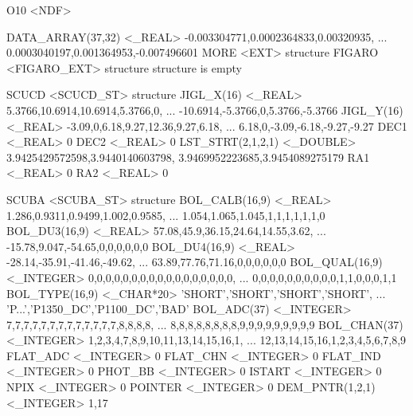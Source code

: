 \documentclass[twoside,11pt,nolof]{starlink}
\begin{document}
\begin{small}
\begin{terminalv}
O10  <NDF>

   DATA_ARRAY(37,32)  <_REAL>     -0.003304771,0.0002364833,0.00320935,
                                  ... 0.0003040197,0.001364953,-0.007496601
   MORE           <EXT>           {structure}
      FIGARO         <FIGARO_EXT>    {structure}
         {structure is empty}

      SCUCD          <SCUCD_ST>      {structure}
         JIGL_X(16)     <_REAL>         5.3766,10.6914,10.6914,5.3766,0,
                                        ... -10.6914,-5.3766,0,5.3766,-5.3766
         JIGL_Y(16)     <_REAL>         -3.09,0,6.18,9.27,12.36,9.27,6.18,
                                        ... 6.18,0,-3.09,-6.18,-9.27,-9.27
         DEC1           <_REAL>         0
         DEC2           <_REAL>         0
         LST_STRT(2,1,2,1)  <_DOUBLE>   3.9425429572598,3.9440140603798,
                                        3.9469952223685,3.9454089275179
         RA1            <_REAL>         0
         RA2            <_REAL>         0

      SCUBA          <SCUBA_ST>      {structure}
         BOL_CALB(16,9)  <_REAL>        1.286,0.9311,0.9499,1.002,0.9585,
                                        ... 1.054,1.065,1.045,1,1,1,1,1,1,0
         BOL_DU3(16,9)  <_REAL>         57.08,45.9,36.15,24.64,14.55,3.62,
                                        ... -15.78,9.047,-54.65,0,0,0,0,0,0
         BOL_DU4(16,9)  <_REAL>         -28.14,-35.91,-41.46,-49.62,
                                        ... 63.89,77.76,71.16,0,0,0,0,0,0
         BOL_QUAL(16,9)  <_INTEGER>     0,0,0,0,0,0,0,0,0,0,0,0,0,0,0,0,0,
                                        ... 0,0,0,0,0,0,0,0,0,0,1,1,0,0,0,1,1
         BOL_TYPE(16,9)  <_CHAR*20>     'SHORT','SHORT','SHORT','SHORT',
                                        ... 'P...','P1350_DC','P1100_DC','BAD'
         BOL_ADC(37)    <_INTEGER>      7,7,7,7,7,7,7,7,7,7,7,7,7,8,8,8,8,
                                        ... 8,8,8,8,8,8,8,8,9,9,9,9,9,9,9,9,9
         BOL_CHAN(37)   <_INTEGER>      1,2,3,4,7,8,9,10,11,13,14,15,16,1,
                                        ... 12,13,14,15,16,1,2,3,4,5,6,7,8,9
         FLAT_ADC       <_INTEGER>      0
         FLAT_CHN       <_INTEGER>      0
         FLAT_IND       <_INTEGER>      0
         PHOT_BB        <_INTEGER>      0
         ISTART         <_INTEGER>      0
         NPIX           <_INTEGER>      0
         POINTER        <_INTEGER>      0
         DEM_PNTR(1,2,1)  <_INTEGER>    1,17


\end{terminalv}
\end{small}
\end{document}
